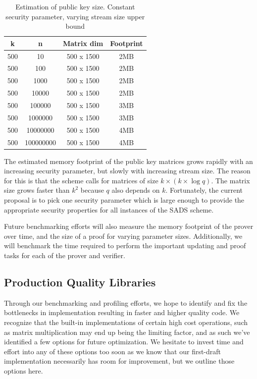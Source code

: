 \documentclass[11pt, letterpaper, oneside]{article}
\begin{document}
	
	\begin{table}[h]
	\centering
		\begin{tabular}{ c | c | c | c}
		k & n & Matrix dim & Footprint\\ \hline
		500&10&500 x 1500&2MB\\
		500&100&500 x 1500&2MB\\
		500&1000&500 x 1500&2MB\\
		500&10000&500 x 1500&2MB\\
		500&100000&500 x 1500&3MB\\
		500&1000000&500 x 1500&3MB\\
		500&10000000&500 x 1500&4MB\\
		500&100000000&500 x 1500&4MB\\
		
		\end{tabular}
	\caption{ Estimation of public key size.  Constant security parameter, varying stream size upper bound }
	\label{tab:pub-key_n}
	\end{table}
	

	The estimated memory footprint of the public key matrices grows rapidly with an increasing security parameter, but slowly with increasing stream size.
	The reason for this is that the scheme calls for matrices of size $k  \times ( k \times \log q )$.
	The matrix size grows faster than $k^2$ because $q$ also depends on $k$.
	Fortunately, the current proposal is to pick one security parameter which is large enough to provide the appropriate security properties for all instances of the SADS scheme.
	
	Future benchmarking efforts will also measure the memory footprint of the prover over time, and the size of a proof for varying parameter sizes. Additionally, we will benchmark the time required to perform the important updating and proof tasks for each of the prover and verifier. 
	


	\subsection{ Production Quality Libraries }
	
	Through our benchmarking and profiling efforts, we hope to identify and fix the bottlenecks in implementation resulting in faster and higher quality code.
	We recognize that the built-in implementations of certain high cost operations, such as matrix multiplication may end up being the limiting factor, and as such we've identified a few options for future optimization.
	We hesitate to invest time and effort into any of these options too soon as we know that our first-draft implementation necessarily has room for improvement, but we outline those options here.
\end{document}
